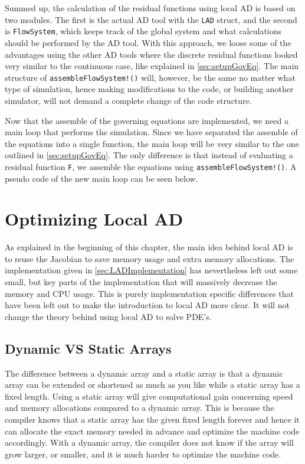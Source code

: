 Summed up, the calculation of the residual functions using local AD is based on two modules. The first is the actual AD tool with the \texttt{LAD} struct, and the second is \texttt{FlowSystem}, which keeps track of the global system and what calculations should be performed by the AD tool. With this approach, we loose some of the advantages using the other AD tools where the discrete residual functions looked very similar to the continuous case, like explained in \autoref{sec:setupGovEq}. The main structure of \texttt{assembleFlowSystem!()} will, however, be the same no matter what type of simulation, hence making modifications to the code, or building another simulator, will not demand a complete change of the code structure.

Now that the assemble of the governing equations are implemented, we need a main loop that performs the simulation. Since we have separated the assemble of the equations into a single function, the main loop will be very similar to the one outlined in \autoref{sec:setupGovEq}. The only difference is that instead of evaluating a residual function \texttt{F}, we assemble the equations using \texttt{assembleFlowSystem!()}. A pseudo code of the new main loop can be seen below. 


\section{Optimizing Local AD}
\label{sec:optimizingLocalAD}
As explained in the beginning of this chapter, the main idea behind local AD is to reuse the Jacobian to save memory usage and extra memory allocations. The implementation given in \autoref{sec:LADImplementation} has nevertheless left out some small, but key parts of the implementation that will massively decrease the memory and CPU usage. This is purely implementation specific differences that have been left out to make the introduction to local AD more clear. It will not change the theory behind using local AD to solve PDE's.

\subsection{Dynamic VS Static Arrays}
The difference between a dynamic array and a static array is that a dynamic array can be extended or shortened as much as you like while a static array has a fixed length. Using a static array will give computational gain concerning speed and memory allocations compared to a dynamic array. This is because the compiler knows that a static array has the given fixed length forever and hence it can allocate the exact memory needed in advance and optimize the machine code accordingly. With a dynamic array, the compiler does not know if the array will grow larger, or smaller, and it is much harder to optimize the machine code. 


